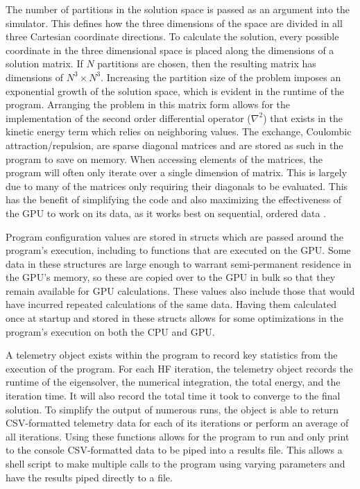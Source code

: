 \documentclass[conference, twoside]{IEEEtran}
\begin{document}
The number of partitions in the solution space is passed as an argument into the simulator. This defines how the three dimensions of the space are divided in all three Cartesian coordinate directions. To calculate the solution, every possible coordinate in the three dimensional space is placed along the dimensions of a solution matrix. If $N$ partitions are chosen, then the resulting matrix has dimensions of $N^3 \times N^3$. Increasing the partition size of the problem imposes an exponential growth of the solution space, which is evident in the runtime of the program. Arranging the problem in this matrix form allows for the implementation of the second order differential operator ($\nabla^2$) that exists in the kinetic energy term which relies on neighboring values. The exchange, Coulombic attraction/repulsion, are sparse diagonal matrices and are stored as such in the program to save on memory. When accessing elements of the matrices, the program will often only iterate over a single dimension of matrix. This is largely due to many of the matrices only requiring their diagonals to be evaluated. This has the benefit of simplifying the code and also maximizing the effectiveness of the GPU to work on its data, as it works best on sequential, ordered data \cite{special-purpose-hf-computer}.

Program configuration values are stored in structs which are passed around the program's execution, including to functions that are executed on the GPU. Some data in these structures are large enough to warrant semi-permanent residence in the GPU's memory, so these are copied over to the GPU in bulk so that they remain available for GPU calculations. These values also include those that would have incurred repeated calculations of the same data. Having them calculated once at startup and stored in these structs allows for some optimizations in the program's execution on both the CPU and GPU.

A telemetry object exists within the program to record key statistics from the execution of the program. For each HF iteration, the telemetry object records the runtime of the eigensolver, the numerical integration, the total energy, and the iteration time. It will also record the total time it took to converge to the final solution. To simplify the output of numerous runs, the object is able to return CSV-formatted telemetry data for each of its iterations or perform an average of all iterations. Using these functions allows for the program to run and only print to the console CSV-formatted data to be piped into a results file. This allows a shell script to make multiple calls to the program using varying parameters and have the results piped directly to a file.
\end{document}
